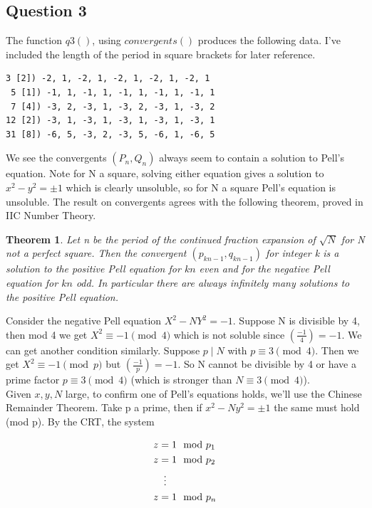 \documentclass[10pt,a4paper]{report}
\newcommand{\legendre}[2]{(\frac{#1}{#2})}
\newtheorem*{theorem}{Theorem}
\begin{document}
\subsection*{Question 3}

The function $q3()$, using $convergents()$ produces the following data. I've included the length of the period in square brackets for later reference.

\begin{lstlisting}[breaklines]
 3 [2]) -2, 1, -2, 1, -2, 1, -2, 1, -2, 1
 5 [1]) -1, 1, -1, 1, -1, 1, -1, 1, -1, 1
 7 [4]) -3, 2, -3, 1, -3, 2, -3, 1, -3, 2
12 [2]) -3, 1, -3, 1, -3, 1, -3, 1, -3, 1
31 [8]) -6, 5, -3, 2, -3, 5, -6, 1, -6, 5
\end{lstlisting}

We see the convergents $(P_n, Q_n)$ always seem to contain a solution to Pell's equation. Note for N a square, solving either equation gives a solution to $x^2-y^2=\pm 1$ which is clearly unsoluble, so for N a square Pell's equation is unsoluble. The result on convergents agrees with the following theorem, proved in IIC Number Theory.

\begin{theorem}
Let n be the period of the continued fraction expansion of $\sqrt{N}$ for N not a perfect square. Then the convergent $(p_{kn-1},q_{kn-1})$ for integer k is a solution to the positive Pell equation for $kn$ even and for the negative Pell equation for $kn$ odd. In particular there are always infinitely many solutions to the positive Pell equation.
\end{theorem}



Consider the negative Pell equation $X^2-NY^2=-1$. Suppose N is divisible by 4, then mod 4 we get $X^2\equiv-1\pmod 4$ which is not soluble since $(\frac{-1}{4})=-1$. We can get another condition similarly. Suppose $p\mid N$ with $p\equiv 3 \pmod 4$. Then we get $X^2\equiv-1\pmod p$ but $\legendre{-1}{p}=-1$. So N cannot be divisible by 4 or have a prime factor $p\equiv 3\pmod 4$ (which is stronger than $N\equiv 3\pmod 4$).\\

Given $x,y,N$ large, to confirm one of Pell's equations holds, we'll use the Chinese Remainder Theorem. Take p a prime, then if $x^2-Ny^2=\pm 1$ the same must hold (mod p). By the CRT, the system

\begin{align*}
   z &= 1 \mod p_1\\
   z &= 1 \mod p_2\\
   &\vdotswithin{=} \notag \\
   z &= 1 \mod p_n\\
\end{align*}
\end{document}
